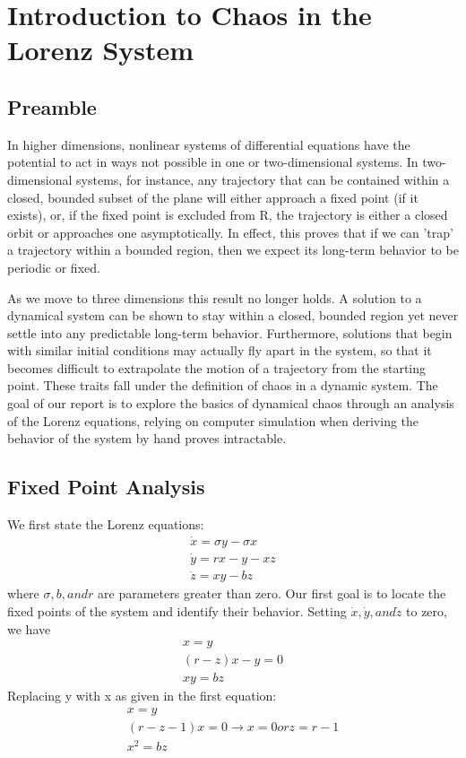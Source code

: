 \documentclass{report}
\begin{document}
\chapter{Introduction to Chaos in the Lorenz System}
\section{Preamble}
In higher dimensions, nonlinear systems of differential equations have the
potential to act in ways not possible in one or two-dimensional systems. In 
two-dimensional systems, for instance, any trajectory that can be contained within a closed, bounded subset of the plane will either approach a fixed point
(if it exists), or, if the fixed point is excluded from R, the trajectory is
either a closed orbit or approaches one asymptotically. In effect, this proves
that if we can 'trap' a trajectory within a bounded region, then we expect its 
long-term behavior to be periodic or fixed.
	
As we move to three dimensions this result no longer holds. A solution to a
dynamical system can be shown to stay within a closed, bounded region yet
never settle into any predictable long-term behavior. Furthermore, solutions 
that begin with similar initial conditions may actually fly apart in the 
system, so that it becomes difficult to extrapolate the motion of a trajectory 
from the starting point. These traits fall under the definition of chaos in a
dynamic system. The goal of our report is to explore the basics of dynamical 
chaos through an analysis of the Lorenz equations, relying on computer
simulation when deriving the behavior of the system by hand proves intractable.

\section{Fixed Point Analysis}

We first state the Lorenz equations:
\begin{align*}
   \dot{x} = \sigma y - \sigma x \\
   \dot{y} = rx - y - xz \\
   \dot{z} = xy - bz
\end{align*}
where \( \sigma , b, and r \) are parameters greater than zero. Our first goal is to
locate the fixed points of the system and identify their behavior. Setting
\( \dot{x}, \dot{y}, and \dot{z}\) to zero, we have
\begin{align*}
   x = y \\
   (r-z)x - y = 0 \\
   xy = bz
\end{align*}
Replacing y with x as given in the first equation:
\begin{align*}
  x = y \\
  (r-z-1)x = 0 \longrightarrow x = 0 or z = r-1 \\
  x^2 = bz
\end{align*}
\end{document}
